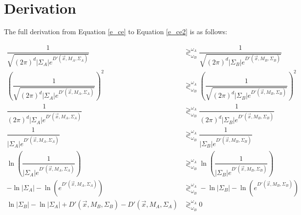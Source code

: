 \documentclass{article}
\begin{document}
\section{Derivation}
\label{app:derivation}

The full derivation from Equation \ref{e_ce} to Equation \ref{e_ce2} is
as follows:

\begin{align*}
  \dfrac{1}{\sqrt{(2\pi)^d |\Sigma_A| e^{D'(\vec{x},M_A,\Sigma_A)}}} 
  &\gtrless^{\omega_A}_{\omega_B}
  \dfrac{1}{\sqrt{(2\pi)^d |\Sigma_B| e^{D'(\vec{x},M_B,\Sigma_B)}}} \\
  \left(\dfrac{1}{\sqrt{(2\pi)^d |\Sigma_A| e^{D'(\vec{x},M_A,\Sigma_A)}}}\right)^2
  &\gtrless^{\omega_A}_{\omega_B}
  \left(\dfrac{1}{\sqrt{(2\pi)^d |\Sigma_B| e^{D'(\vec{x},M_B,\Sigma_B)}}}\right)^2 \\
  \dfrac{1}{(2\pi)^d |\Sigma_A| e^{D'(\vec{x},M_A,\Sigma_A)}}
  &\gtrless^{\omega_A}_{\omega_B}
  \dfrac{1}{(2\pi)^d |\Sigma_B| e^{D'(\vec{x},M_B,\Sigma_B)}} \\
  \dfrac{1}{|\Sigma_A| e^{D'(\vec{x},M_A,\Sigma_A)}}
  &\gtrless^{\omega_A}_{\omega_B}
  \dfrac{1}{|\Sigma_B| e^{D'(\vec{x},M_B,\Sigma_B)}} \\
  \ln\left(\dfrac{1}{|\Sigma_A| e^{D'(\vec{x},M_A,\Sigma_A)}}\right)
  &\gtrless^{\omega_A}_{\omega_B}
  \ln\left(\dfrac{1}{|\Sigma_B| e^{D'(\vec{x},M_B,\Sigma_B)}}\right) \\
  -\ln|\Sigma_A| - \ln(e^{D'(\vec{x},M_A,\Sigma_A)})
  &\gtrless^{\omega_A}_{\omega_B}
  -\ln|\Sigma_B| - \ln(e^{D'(\vec{x},M_B,\Sigma_B)}) \\
  \ln|\Sigma_B| - \ln|\Sigma_A| +
  D'(\vec{x},M_B,\Sigma_B) - D'(\vec{x},M_A,\Sigma_A)
  &\gtrless^{\omega_A}_{\omega_B}
  0
\end{align*}


\end{document}
